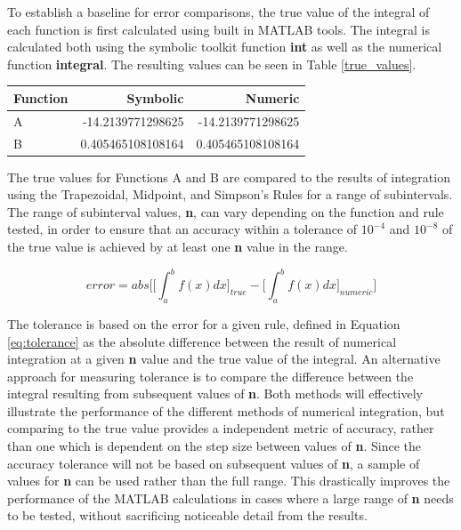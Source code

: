 \documentclass{article}
\begin{document}
To establish a baseline for error comparisons, the true value of the integral of each function is first calculated using built in MATLAB tools. The integral is calculated both using the symbolic toolkit function \textbf{int} as well as the numerical function \textbf{integral}. The resulting values can be seen in Table \ref{true_values}.

\bgroup
\def\arraystretch{1.5}
\begin{center}
	\centering
	\begin{tabular}{l|r|r}
	\textbf{Function} & \textbf{Symbolic} & \textbf{Numeric} \\
	\hline
	A & -14.2139771298625 & -14.2139771298625\\
	B & 0.405465108108164 & 0.405465108108164
	\end{tabular}
	\label{true_values}
\end{center}
\egroup

The true values for Functions A and B are compared to the results of integration using the Trapezoidal, Midpoint, and Simpson's Rules for a range of subintervals. The range of subinterval values, \textbf{n}, can vary depending on the function and rule tested, in order to ensure that an accuracy within a tolerance of $10^{-4}$ and $10^{-8}$ of the true value is achieved by at least one \textbf{n} value in the range. 

\begin{equation}
error = abs\Bigg[\Big[ \int_{a}^{b}f(x)dx \Big]_{true} - \Big[ \int_{a}^{b}f(x)dx \Big]_{numeric}\Bigg]
\label{eq:tolerance}
\end{equation}

The tolerance is based on the error for a given rule, defined in Equation \ref{eq:tolerance} as the absolute difference between the result of numerical integration at a given \textbf{n} value and the true value of the integral. An alternative approach for measuring tolerance is to compare the difference between the integral resulting from subsequent values of \textbf{n}. Both methods will effectively illustrate the performance of the different methods of numerical integration, but comparing to the true value provides a independent metric of accuracy, rather than one which is dependent on the step size between values of \textbf{n}. Since the accuracy tolerance will not be based on subsequent values of \textbf{n}, a sample of values for \textbf{n} can be used rather than the full range. This drastically improves the performance of the MATLAB calculations in cases where a large range of \textbf{n} needs to be tested, without sacrificing noticeable detail from the results. 
\end{document}
